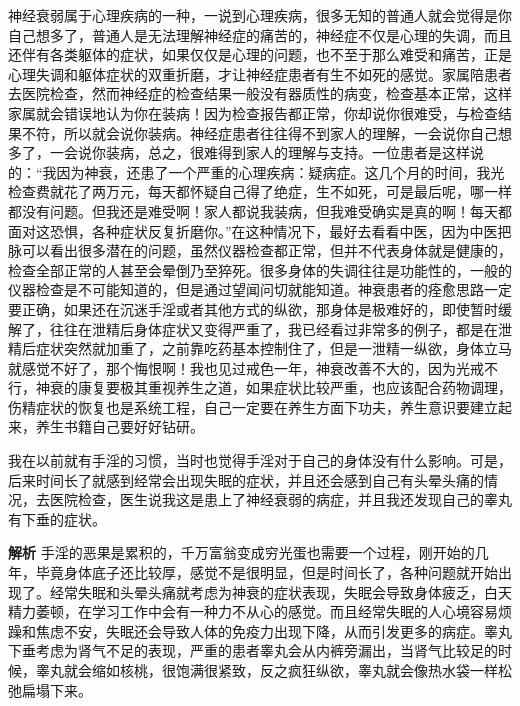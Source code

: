 神经衰弱属于心理疾病的一种，一说到心理疾病，很多无知的普通人就会觉得是你自己想多了，普通人是无法理解神经症的痛苦的，神经症不仅是心理的失调，而且还伴有各类躯体的症状，如果仅仅是心理的问题，也不至于那么难受和痛苦，正是心理失调和躯体症状的双重折磨，才让神经症患者有生不如死的感觉。家属陪患者去医院检查，然而神经症的检查结果一般没有器质性的病变，检查基本正常，这样家属就会错误地认为你在装病！因为检查报告都正常，你却说你很难受，与检查结果不符，所以就会说你装病。神经症患者往往得不到家人的理解，一会说你自己想多了，一会说你装病，总之，很难得到家人的理解与支持。一位患者是这样说的：“我因为神衰，还患了一个严重的心理疾病：疑病症。这几个月的时间，我光检查费就花了两万元，每天都怀疑自己得了绝症，生不如死，可是最后呢，哪一样都没有问题。但我还是难受啊！家人都说我装病，但我难受确实是真的啊！每天都面对这恐惧，各种症状反复折磨你。”在这种情况下，最好去看看中医，因为中医把脉可以看出很多潜在的问题，虽然仪器检查都正常，但并不代表身体就是健康的，检查全部正常的人甚至会晕倒乃至猝死。很多身体的失调往往是功能性的，一般的仪器检查是不可能知道的，但是通过望闻问切就能知道。神衰患者的痊愈思路一定要正确，如果还在沉迷手淫或者其他方式的纵欲，那身体是极难好的，即使暂时缓解了，往往在泄精后身体症状又变得严重了，我已经看过非常多的例子，都是在泄精后症状突然就加重了，之前靠吃药基本控制住了，但是一泄精一纵欲，身体立马就感觉不好了，那个悔恨啊！我也见过戒色一年，神衰改善不大的，因为光戒不行，神衰的康复要极其重视养生之道，如果症状比较严重，也应该配合药物调理，伤精症状的恢复也是系统工程，自己一定要在养生方面下功夫，养生意识要建立起来，养生书籍自己要好好钻研。

\begin{case}[神经衰弱]
    我在以前就有手淫的习惯，当时也觉得手淫对于自己的身体没有什么影响。可是，后来时间长了就感到经常会出现失眠的症状，并且还会感到自己有头晕头痛的情况，去医院检查，医生说我这是患上了神经衰弱的病症，并且我还发现自己的睾丸有下垂的症状。

    \textbf{解析} 手淫的恶果是累积的，千万富翁变成穷光蛋也需要一个过程，刚开始的几年，毕竟身体底子还比较厚，感觉不是很明显，但是时间长了，各种问题就开始出现了。经常失眠和头晕头痛就考虑为神衰的症状表现，失眠会导致身体疲乏，白天精力萎顿，在学习工作中会有一种力不从心的感觉。而且经常失眠的人心境容易烦躁和焦虑不安，失眠还会导致人体的免疫力出现下降，从而引发更多的病症。睾丸下垂考虑为肾气不足的表现，严重的患者睾丸会从内裤旁漏出，当肾气比较足的时候，睾丸就会缩如核桃，很饱满很紧致，反之疯狂纵欲，睾丸就会像热水袋一样松弛扁塌下来。
\end{case}

